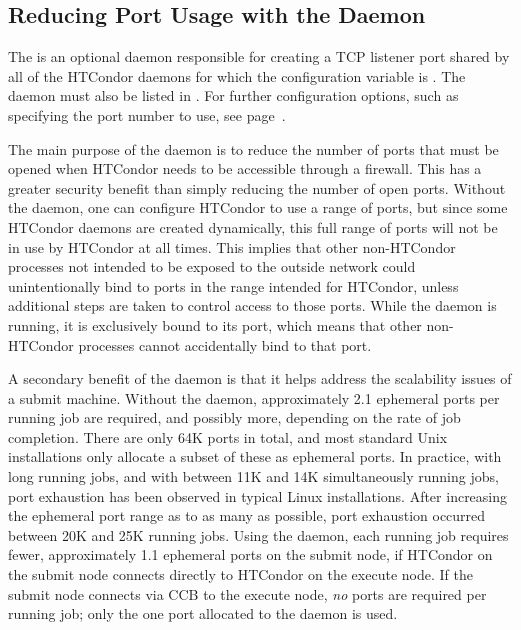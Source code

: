\subsection{\label{sec:shared-port-daemon}Reducing Port Usage with the  Daemon}

The  is an optional daemon
responsible for creating a TCP listener port shared by all of the
HTCondor daemons for which the configuration variable
 is .
The  daemon must also be listed in .  For further configuration
options, such as specifying the port number to use, see page~\pageref{sec:Config-shared-port}.

The main purpose of the  daemon is to reduce the
number of ports that must be opened when HTCondor needs to be
accessible through a firewall.
This has a greater security benefit
than simply reducing the number of open ports.
Without the  daemon,
one can configure HTCondor to use a range of ports,
but since some HTCondor daemons are created dynamically, 
this full range of ports will not be in use by HTCondor at all times.
This implies that other non-HTCondor processes not intended to be exposed to
the outside network could unintentionally bind to ports in the range
intended for HTCondor,
unless additional steps are taken to control access to those ports.  
While the  daemon is running,
it is exclusively bound to its port, which means that other non-HTCondor
processes cannot accidentally bind to that port.

A secondary benefit of the  daemon
is that it helps address the scalability issues of a submit machine.
Without the  daemon,
approximately 2.1 ephemeral ports per running job are required,
and possibly more, depending on the rate of job completion.
There are only 64K ports in total,
and most standard Unix installations only allocate a subset of
these as ephemeral ports.
In practice, with long running jobs,
and with between 11K and 14K simultaneously running jobs,
port exhaustion has been observed in typical Linux installations.
After increasing the ephemeral port range as to as many as possible,
port exhaustion occurred between 20K and 25K running jobs.
Using the  daemon,
each running job requires fewer, approximately 1.1 ephemeral ports
on the submit node, if HTCondor on the submit node connects directly
to HTCondor on the execute node.
If the submit node connects via CCB to the execute
node, \emph{no} ports are required per running job; only the one port
allocated to the  daemon is used.

